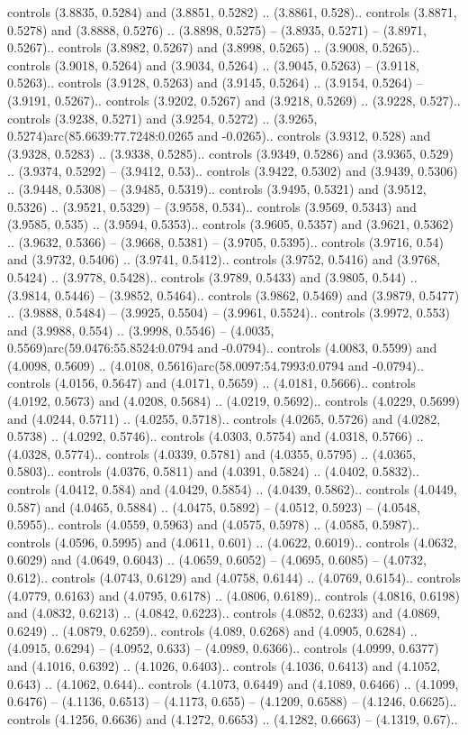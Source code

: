 controls (3.8835, 0.5284) and (3.8851, 0.5282) .. (3.8861, 0.528).. controls (3.8871, 0.5278) and (3.8888, 0.5276) .. (3.8898, 0.5275) -- (3.8935, 0.5271) -- (3.8971, 0.5267).. controls (3.8982, 0.5267) and (3.8998, 0.5265) .. (3.9008, 0.5265).. controls (3.9018, 0.5264) and (3.9034, 0.5264) .. (3.9045, 0.5263) -- (3.9118, 0.5263).. controls (3.9128, 0.5263) and (3.9145, 0.5264) .. (3.9154, 0.5264) -- (3.9191, 0.5267).. controls (3.9202, 0.5267) and (3.9218, 0.5269) .. (3.9228, 0.527).. controls (3.9238, 0.5271) and (3.9254, 0.5272) .. (3.9265, 0.5274)arc(85.6639:77.7248:0.0265 and -0.0265).. controls (3.9312, 0.528) and (3.9328, 0.5283) .. (3.9338, 0.5285).. controls (3.9349, 0.5286) and (3.9365, 0.529) .. (3.9374, 0.5292) -- (3.9412, 0.53).. controls (3.9422, 0.5302) and (3.9439, 0.5306) .. (3.9448, 0.5308) -- (3.9485, 0.5319).. controls (3.9495, 0.5321) and (3.9512, 0.5326) .. (3.9521, 0.5329) -- (3.9558, 0.534).. controls (3.9569, 0.5343) and (3.9585, 0.535) .. (3.9594, 0.5353).. controls (3.9605, 0.5357) and (3.9621, 0.5362) .. (3.9632, 0.5366) -- (3.9668, 0.5381) -- (3.9705, 0.5395).. controls (3.9716, 0.54) and (3.9732, 0.5406) .. (3.9741, 0.5412).. controls (3.9752, 0.5416) and (3.9768, 0.5424) .. (3.9778, 0.5428).. controls (3.9789, 0.5433) and (3.9805, 0.544) .. (3.9814, 0.5446) -- (3.9852, 0.5464).. controls (3.9862, 0.5469) and (3.9879, 0.5477) .. (3.9888, 0.5484) -- (3.9925, 0.5504) -- (3.9961, 0.5524).. controls (3.9972, 0.553) and (3.9988, 0.554) .. (3.9998, 0.5546) -- (4.0035, 0.5569)arc(59.0476:55.8524:0.0794 and -0.0794).. controls (4.0083, 0.5599) and (4.0098, 0.5609) .. (4.0108, 0.5616)arc(58.0097:54.7993:0.0794 and -0.0794).. controls (4.0156, 0.5647) and (4.0171, 0.5659) .. (4.0181, 0.5666).. controls (4.0192, 0.5673) and (4.0208, 0.5684) .. (4.0219, 0.5692).. controls (4.0229, 0.5699) and (4.0244, 0.5711) .. (4.0255, 0.5718).. controls (4.0265, 0.5726) and (4.0282, 0.5738) .. (4.0292, 0.5746).. controls (4.0303, 0.5754) and (4.0318, 0.5766) .. (4.0328, 0.5774).. controls (4.0339, 0.5781) and (4.0355, 0.5795) .. (4.0365, 0.5803).. controls (4.0376, 0.5811) and (4.0391, 0.5824) .. (4.0402, 0.5832).. controls (4.0412, 0.584) and (4.0429, 0.5854) .. (4.0439, 0.5862).. controls (4.0449, 0.587) and (4.0465, 0.5884) .. (4.0475, 0.5892) -- (4.0512, 0.5923) -- (4.0548, 0.5955).. controls (4.0559, 0.5963) and (4.0575, 0.5978) .. (4.0585, 0.5987).. controls (4.0596, 0.5995) and (4.0611, 0.601) .. (4.0622, 0.6019).. controls (4.0632, 0.6029) and (4.0649, 0.6043) .. (4.0659, 0.6052) -- (4.0695, 0.6085) -- (4.0732, 0.612).. controls (4.0743, 0.6129) and (4.0758, 0.6144) .. (4.0769, 0.6154).. controls (4.0779, 0.6163) and (4.0795, 0.6178) .. (4.0806, 0.6189).. controls (4.0816, 0.6198) and (4.0832, 0.6213) .. (4.0842, 0.6223).. controls (4.0852, 0.6233) and (4.0869, 0.6249) .. (4.0879, 0.6259).. controls (4.089, 0.6268) and (4.0905, 0.6284) .. (4.0915, 0.6294) -- (4.0952, 0.633) -- (4.0989, 0.6366).. controls (4.0999, 0.6377) and (4.1016, 0.6392) .. (4.1026, 0.6403).. controls (4.1036, 0.6413) and (4.1052, 0.643) .. (4.1062, 0.644).. controls (4.1073, 0.6449) and (4.1089, 0.6466) .. (4.1099, 0.6476) -- (4.1136, 0.6513) -- (4.1173, 0.655) -- (4.1209, 0.6588) -- (4.1246, 0.6625).. controls (4.1256, 0.6636) and (4.1272, 0.6653) .. (4.1282, 0.6663) -- (4.1319, 0.67).. 